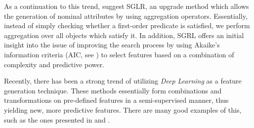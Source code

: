 \documentclass{article}
\theoremstyle{definition}
\begin{document}
As a continuation to this trend, \citet{popescul200716} suggest SGLR, an upgrade method which allows the generation of nominal attributes by using aggregation operators. Essentially, instead of simply checking whether a first-order predicate is satisfied, we perform aggregation over all objects which satisfy it. In addition, SGRL offers an initial insight into the issue of improving the search process by using Akaike's information criteria (AIC, see \citet{burnham2002model}) to select features based on a combination of complexity and predictive power. 



Recently, there has been a strong trend of utilizing \emph{Deep Learning} \citep{lecun1998gradient, bengio2009learning} as a feature generation technique. These methods essentially form combinations and transformations on pre-defined features in a semi-supervised manner, thus yielding new, more predictive features.
There are many good examples of this, such as the ones presented in \citet{plotz2011feature} and \citet{kim2013deep}.
\end{document}
